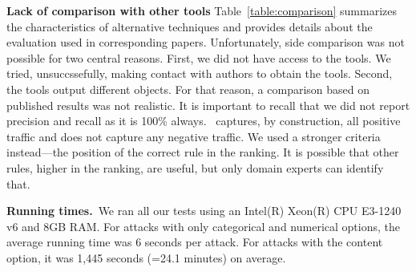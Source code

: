 \documentclass[conference]{IEEEtran}
\begin{document}




\noindent\textbf{Lack of comparison with other tools}
Table~\ref{table:comparison} summarizes the characteristics of
alternative techniques and provides details about the evaluation used
in corresponding papers. Unfortunately, side comparison was not
possible for two central reasons. First, we did not have access to the
tools. We tried, unsuccssefully, making contact with authors to obtain
the tools. Second, the tools output different objects. For that
reason, a comparison based on published results was not realistic. It
is important to recall that we did not report precision and recall as
it is 100\% always. \tname\ captures, by construction, all positive
traffic and does not capture any negative traffic. We used a stronger
criteria instead---the position of the correct rule in the ranking. It
is possible that other rules, higher in the ranking, are useful, but
only domain experts can identify that.

\noindent\textbf{Running times.}~We ran all our tests using an
Intel(R) Xeon(R) CPU E3-1240 v6 and 8GB RAM. For attacks with only
categorical and numerical options, the average running time was 6
seconds per attack. For attacks with the content option, it was 
1,445 seconds (=24.1 minutes) on average.  
\end{document}
